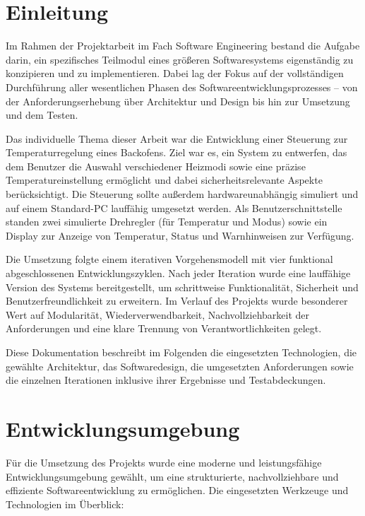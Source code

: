 \documentclass[a4paper,12pt]{article}
\begin{document}
\section*{Einleitung}

Im Rahmen der Projektarbeit im Fach Software Engineering bestand die Aufgabe darin, ein spezifisches Teilmodul eines größeren Softwaresystems eigenständig zu konzipieren und zu implementieren. Dabei lag der Fokus auf der vollständigen Durchführung aller wesentlichen Phasen des Softwareentwicklungsprozesses – von der Anforderungserhebung über Architektur und Design bis hin zur Umsetzung und dem Testen.

Das individuelle Thema dieser Arbeit war die Entwicklung einer Steuerung zur Temperaturregelung eines Backofens. Ziel war es, ein System zu entwerfen, das dem Benutzer die Auswahl verschiedener Heizmodi sowie eine präzise Temperatureinstellung ermöglicht und dabei sicherheitsrelevante Aspekte berücksichtigt. Die Steuerung sollte außerdem hardwareunabhängig simuliert und auf einem Standard-PC lauffähig umgesetzt werden. Als Benutzerschnittstelle standen zwei simulierte Drehregler (für Temperatur und Modus) sowie ein Display zur Anzeige von Temperatur, Status und Warnhinweisen zur Verfügung.

Die Umsetzung folgte einem iterativen Vorgehensmodell mit vier funktional abgeschlossenen Entwicklungszyklen. Nach jeder Iteration wurde eine lauffähige Version des Systems bereitgestellt, um schrittweise Funktionalität, Sicherheit und Benutzerfreundlichkeit zu erweitern. Im Verlauf des Projekts wurde besonderer Wert auf Modularität, Wiederverwendbarkeit, Nachvollziehbarkeit der Anforderungen und eine klare Trennung von Verantwortlichkeiten gelegt.

Diese Dokumentation beschreibt im Folgenden die eingesetzten Technologien, die gewählte Architektur, das Softwaredesign, die umgesetzten Anforderungen sowie die einzelnen Iterationen inklusive ihrer Ergebnisse und Testabdeckungen.

\newpage

\section{Entwicklungsumgebung}

Für die Umsetzung des Projekts wurde eine moderne und leistungsfähige Entwicklungsumgebung gewählt, um eine strukturierte, nachvollziehbare und effiziente Softwareentwicklung zu ermöglichen. Die eingesetzten Werkzeuge und Technologien im Überblick:
\end{document}
